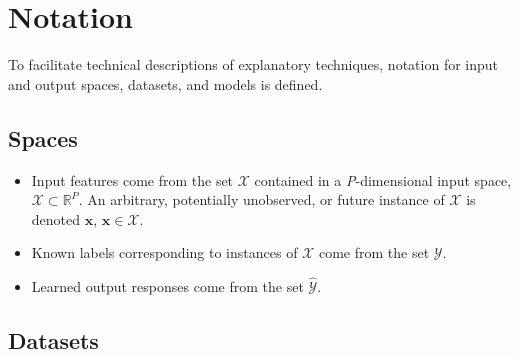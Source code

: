 \documentclass[sigconf, review]{acmart}
\begin{document}
\section{Notation} \label{sec:notation}

To facilitate technical descriptions of explanatory techniques, notation for input and output spaces, datasets, and models is defined.

\subsection{Spaces} 
 
	\begin{itemize}
		\item Input features come from the set $\mathcal{X}$ contained in a \textit{P}-dimensional input space, $\mathcal{X} \subset \mathbb{R}^P$.  An arbitrary, potentially unobserved, or future instance of $\mathcal{X}$ is denoted $\mathbf{x}$, $\mathbf{x} \in \mathcal{X}$.
		\item Known labels corresponding to instances of $\mathcal{X}$ come from the set $\mathcal{Y}$.
		\item Learned output responses come from the set $\mathcal{\hat{Y}}$. %
	\end{itemize}	
	
\subsection{Datasets} 
\end{document}
